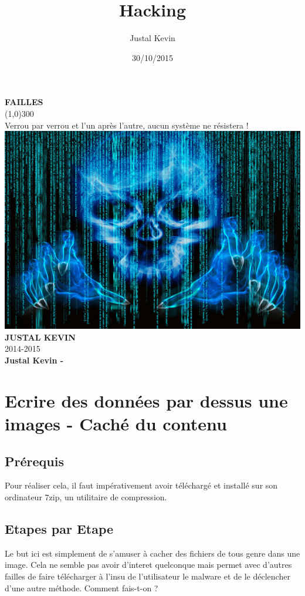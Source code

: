 \documentclass{article}
\title{Hacking}
\author{Justal Kevin}
\date{30/10/2015}
\begin{document}
\begin{center}
\textbf{\Huge{FAILLES}}\\
\line(1,0){300}\\
Verrou par verrou et l'un apr\`es l'autre, aucun syst\`eme ne r\'esistera !\\
\vspace{3cm}
\includegraphics[width=\textwidth]{0}\\
\vspace{3cm}
\textbf{\Large{JUSTAL KEVIN}}\\
2014-2015\\
\vspace{4cm}
\textbf{Justal Kevin - }\\
\end{center}

\newpage
\tableofcontents

\newpage
\section{Ecrire des données par dessus une images - Caché du contenu}
\subsection{Prérequis}
\hspace*{0.6cm}Pour réaliser cela, il faut impérativement avoir téléchargé et installé sur son ordinateur 7zip, un utilitaire de compression.
\subsection{Etapes par Etape}
\hspace*{0.6cm}Le but ici est simplement de s'amuser à cacher des fichiers de tous genre dans une image. Cela ne semble pas avoir d'interet quelconque mais permet avec d'autres failles de faire télécharger à l'insu de l'utilisateur le malware et de le déclencher d'une autre méthode. Comment fais-t-on ?
\end{document}
